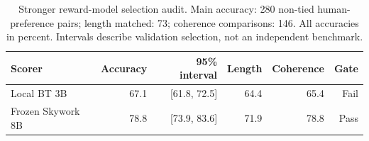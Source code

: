 \begin{table}[htbp]
\centering\footnotesize
\caption{Stronger reward-model selection audit. Main accuracy: 280 non-tied human-preference pairs; length matched: 73; coherence comparisons: 146. All accuracies in percent. Intervals describe validation selection, not an independent benchmark.}\label{tab:reward-audit-new}
\begin{tabular}{@{}lrrrrr@{}}
\toprule
Scorer & Accuracy & 95\% interval & Length & Coherence & Gate\\
\midrule
Local BT 3B & 67.1 & [61.8, 72.5] & 64.4 & 65.4 & Fail\\
Frozen Skywork 8B & 78.8 & [73.9, 83.6] & 71.9 & 78.8 & Pass\\
\bottomrule
\end{tabular}
\end{table}
